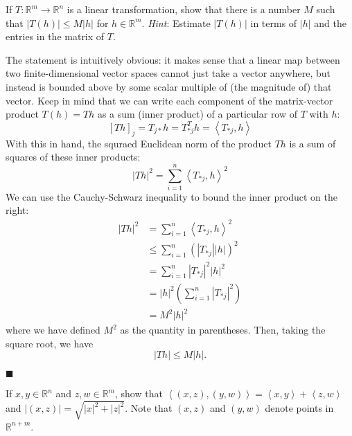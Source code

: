 \documentclass[12pt]{article}
\renewcommand{\qed}{\hfill$\blacksquare$}
\renewenvironment{proof}{\begin{addmargin}[1em]{0em}\begin{newproof}}{\end{newproof}\end{addmargin}\qed}
\newenvironment{problem}[2][Problem]{\begin{trivlist}
\item[\hskip \labelsep {\bfseries #1}\hskip \labelsep {\bfseries #2.}]}{\end{trivlist}}
\begin{document}
 
\begin{problem}{1-10} 
If $T:\mathbb{R}^m \rightarrow \mathbb{R}^n$ is a linear transformation, show that there is a number $M$ such that $\left| T\left(h\right)\right| \leq M \left|h\right|$ for $h \in \mathbb{R}^m$. \textit{Hint}: Estimate $\left|T\left(h\right)\right|$ in terms of $\left|h\right|$ and the entries in the matrix of $T$.
\end{problem}
 
\begin{proof}
The statement is intuitively obvious: it makes sense that a linear map between two finite-dimensional vector spaces cannot just take a vector anywhere, but instead is bounded above by some scalar multiple of (the magnitude of) that vector. Keep in mind that we can write each component of the matrix-vector product $T\left(h\right) = T h$ as a sum (inner product) of a particular row of $T$ with $h$:
$$\left[ Th\right]_j = T_{j*} h = T_{*j}^Th = \left\langle T_{*j}, h\right\rangle $$ With this in hand, the squraed Euclidean norm of the product $Th$ is a sum of squares of these inner products: $$ \left| Th\right|^2 = \sum_{i=1}^n  \left\langle T_{*j}, h\right\rangle^2 $$ We can use the Cauchy-Schwarz inequality to bound the inner product on the right:
\begin{equation*}
\begin{split}
\left| Th\right|^2 & = \sum_{i=1}^n  \left\langle T_{*j}, h\right\rangle^2  \\
& \leq \sum_{i=1}^n \left( \left|T_{*j}\right|\left|h\right|\right)^2 \\
& = \sum_{i=1}^n \left|T_{*j}\right|^2 \left|h\right|^2 \\
& = \left|h\right|^2 \left(\sum_{i=1}^n \left|T_{*j}\right|^2\right) \\
& = M^2 \left|h\right|^2
\end{split}
\end{equation*}
where we have defined $M^2$ as the quantity in parentheses. Then, taking the square root, we have $$ \left|Th\right| \leq M\left|h\right|. $$
\end{proof}
 
 
 
 
\begin{problem}{1-11}
If $x,y\in \mathbb{R}^n$ and $z,w\in \mathbb{R}^m$, show that $\left\langle \left(x,z\right),\left(y,w\right) \right\rangle = \left\langle x,y \right\rangle + \left\langle z,w\right\rangle$ and $\left|\left(x,z\right)\right| = \sqrt{\left|x\right|^2+\left|z\right|^2}$. Note that $\left(x,z\right)$ and $\left(y,w\right)$ denote points in $\mathbb{R}^{n+m}$.
\end{problem}
 
\end{document}
